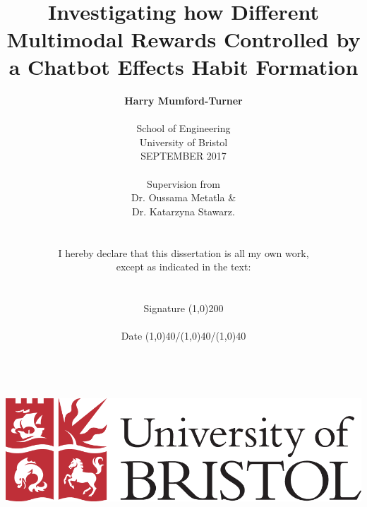 

\date{} %

\title{\huge{\textbf{\\\\\\Investigating how Different Multimodal Rewards Controlled by a Chatbot Effects Habit Formation}}}
\author{\textbf{Harry Mumford-Turner}\\
\\
School of Engineering\\
University of Bristol\\
SEPTEMBER 2017\\
\\
Supervision from\\
Dr. Oussama Metatla \&\\Dr. Katarzyna Stawarz.
\\
\\\\
I hereby declare that this dissertation is all my own work,\\
except as indicated in the text:\\
\\
\\
Signature \line(1,0){200}\\
\\
Date \line(1,0){40}/\line(1,0){40}/\line(1,0){40}\\
\\
\\
\\
\\
\includegraphics[scale=0.29]{resources/UoB-logo.png}}
